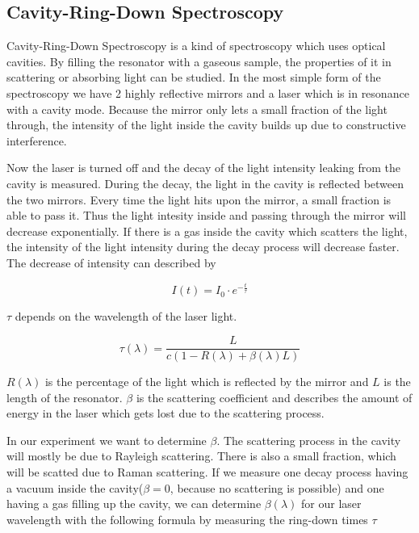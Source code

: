 \documentclass[10pt,a4paper]{article}
\begin{document}
\subsection{Cavity-Ring-Down Spectroscopy}

Cavity-Ring-Down Spectroscopy is a kind of spectroscopy which uses optical cavities. By filling the resonator with a gaseous sample, the properties of it in scattering or absorbing light can be studied. In the most simple form of the spectroscopy we have 2 highly reflective mirrors and a laser which is in resonance with a cavity mode. Because the mirror only lets a small fraction of the light through, the intensity of the light inside the cavity builds up due to constructive interference. 

Now the laser is turned off and the decay of the light intensity leaking from the cavity is measured. During the decay, the light in the cavity is reflected between the two mirrors. Every time the light hits upon the mirror, a small fraction is able to pass it. Thus the light intesity inside and passing through the mirror will decrease exponentially. If there is a gas inside the cavity which scatters the light, the intensity of the light intensity during the decay process will decrease faster. The decrease of intensity can described by

\begin{equation}
I(t) = I_0 \cdot e^{- \frac{t}{\tau}}
\end{equation}

$\tau$ depends on the wavelength of the laser light.

\begin{equation}
\tau (\lambda) = \frac{L}{c (1- R(\lambda) + \beta(\lambda) L)}
\label{tau_formel}
\end{equation}

$R(\lambda)$ is the percentage of the light which is reflected by the mirror and $L$ is the length of the resonator. $\beta$ is the scattering coefficient and describes the amount of energy in the laser which gets lost due to the scattering process.

In our experiment we want to determine $\beta$. The scattering process in the cavity will mostly be due to Rayleigh scattering. There is also a small fraction, which will be scatted due to Raman scattering. If we measure one decay process having a vacuum inside the cavity($\beta = 0$, because no scattering is possible) and one having a gas filling up the cavity, we can determine $\beta(\lambda)$ for our laser wavelength with the following formula by measuring the ring-down times $\tau$
\end{document}
